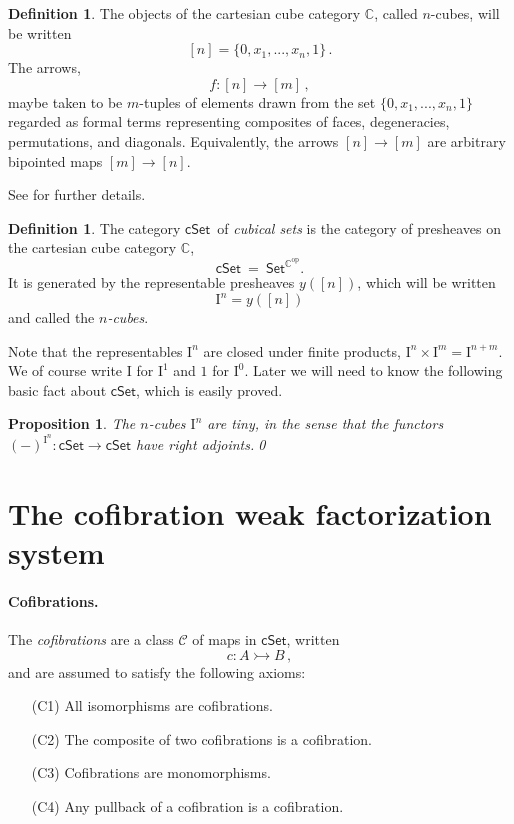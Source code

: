 \documentclass[12pt]{article}
\newcommand{\C}{\ensuremath{\mathbb{C}}}
\newcommand{\psh}[1]{\ensuremath{\mathsf{Set}^{#1^{\mathrm{op}}}}}
\newcommand{\cSet}{\ensuremath{\mathsf{cSet}}}
\newcommand{\mono}{\ensuremath{\rightarrowtail}}
\newcommand{\ra}{\ensuremath{\rightarrow}}
\newcommand{\I}{\ensuremath{\mathrm{I}}}
\newtheorem{proposition}[theorem]{Proposition}
\theoremstyle{remark}
\theoremstyle{definition}
\newtheorem{definition}[theorem]{Definition}
\begin{document}
\begin{definition}
The objects of the cartesian cube category $\C$, called $n$-cubes, will be written $$[n] = \{0, x_1, ..., x_n, 1\}\,.$$  
The arrows,
\[
f : [n] \ra [m]\,,
\]
maybe taken to be $m$-tuples of elements drawn from the set $\{0, x_1, ..., x_n, 1\}$ regarded as formal terms representing composites of faces, degeneracies, permutations, and diagonals.  Equivalently, the arrows $[n] \ra [m]$ are arbitrary bipointed maps $[m]\ra [n]$.
\end{definition}
See \cite{parker:thesis} for further details.

\begin{definition}\label{def:cSet}
The category \cSet\ of \emph{cubical sets} is the category of presheaves on the cartesian cube category $\C$,
\[
\mathsf{cSet}\ =\ \psh{\C}.
\]
It is generated by the representable presheaves $y([n])$, which will be written $$\I^n = y([n])$$ and called the \emph{$n$-cubes}.   
\end{definition}

Note that the representables $\I^n$ are closed under finite products, $\I^n \times \I^m = \I^{n+m}$. We of course write $\I$ for $\I^1$ and $1$ for $\I^0$.
Later we will need to know the following basic fact about $\cSet$, which is easily proved.

\begin{proposition}\label{prop:Itiny}
The $n$-cubes $\I^n$ are \emph{tiny}, in the sense that the functors $(-)^{\I^n} : \cSet\ra\cSet$ have right adjoints.\qed
\end{proposition}


\section{The cofibration weak factorization system}\label{sec:cofibrations}

\paragraph{Cofibrations.}
The \emph{cofibrations} are a class $\mathcal{C}$ of maps in $\mathsf{cSet}$, written $$c : A \mono B\,,$$  
and are assumed to satisfy the following axioms:
\begin{enumerate}
\item[(C1)] All isomorphisms are cofibrations.
\item[(C2)] The composite of two cofibrations is a cofibration.
\item[(C3)] Cofibrations are monomorphisms.
\item[(C4)] Any pullback of a cofibration is a cofibration.
\end{enumerate}
\end{document}
